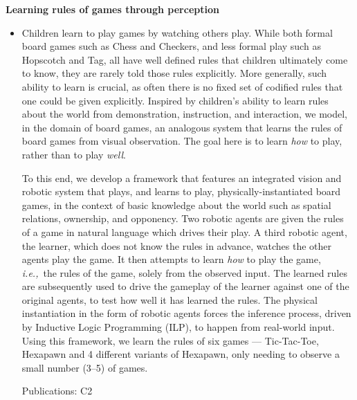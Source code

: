 \documentclass[10pt]{article}
\newenvironment{researchBlock}[1]{%
  \vspace*{0.5ex}
  {\noindent\large \textbf{#1}}
  \begin{itemize}\item}
  {\end{itemize}\vspace{3ex}}
\newcommand{\refr}[1]{{\color{RoyalBlue} #1}}
\newcommand{\ie}{\emph{i.e.,}}
\begin{document}
\begin{researchBlock} {Learning rules of games through perception}
  Children learn to play games by watching others play.
  While both formal board games such as Chess and Checkers, and less formal
  play such as Hopscotch and Tag, all have well defined rules that children
  ultimately come to know, they are rarely told those rules explicitly.
  More generally, such ability to learn is crucial, as often there is no fixed
  set of codified rules that one could be given explicitly.
  Inspired by children's ability to learn rules about the world from
  demonstration, instruction, and interaction, we model, in the domain of board
  games, an analogous system that learns the rules of board games from visual
  observation.
  The goal here is to learn \emph{how} to play, rather than to play
  \emph{well}.

  To this end, we develop a framework that features an integrated vision and
  robotic system that plays, and learns to play, physically-instantiated board
  games, in the context of basic knowledge about the world such as spatial
  relations, ownership, and opponency.
  Two robotic agents are given the rules of a game in natural language which
  drives their play. A third robotic agent, the learner, which does not know
  the rules in advance, watches the other agents play the game.
  It then attempts to learn \emph{how} to play the game, \ie\ the rules of the
  game, solely from the observed input.
  The learned rules are subsequently used to drive the gameplay of the learner
  against one of the original agents, to test how well it has learned the
  rules.
  The physical instantiation in the form of robotic agents forces the inference
  process, driven by Inductive Logic Programming (ILP), to happen from
  real-world input.
  Using this framework, we learn the rules of six games --- Tic-Tac-Toe,
  Hexapawn and 4 different variants of Hexapawn, only needing to observe a
  small number (3--5) of games.

  \vspace{2ex}
  Publications: \refr{C2}
\end{researchBlock}
\end{document}
